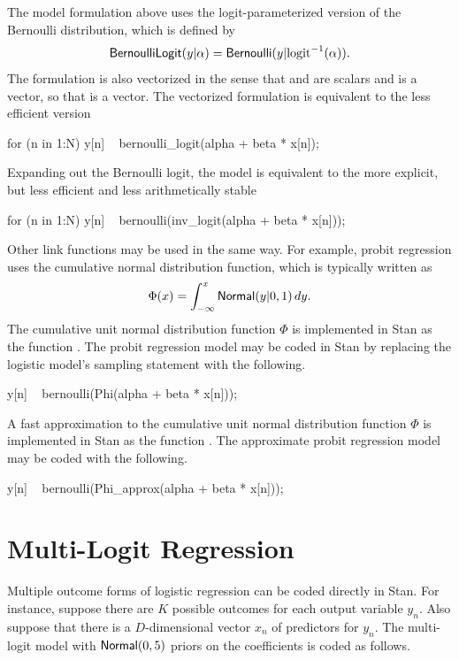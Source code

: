 The model formulation above uses the logit-parameterized version of
the Bernoulli distribution, which is defined by
%
\[
\mbox{\sf BernoulliLogit}(y|\alpha)
=
\mbox{\sf Bernoulli}(y | \mbox{logit}^{-1}(\alpha)).
\]
%
The formulation is also vectorized in the sense that  and
 are scalars and  is a vector, so that  is a vector.  The vectorized formulation is equivalent
to the less efficient version
%

\begin{stancode}
for (n in 1:N)
  y[n] ~ bernoulli_logit(alpha + beta * x[n]);
\end{stancode}
%
Expanding out the Bernoulli logit, the model is equivalent to the more
explicit, but less efficient and less arithmetically stable
%

\begin{stancode}
for (n in 1:N)
  y[n] ~ bernoulli(inv_logit(alpha + beta * x[n]));
\end{stancode}

Other link functions may be used in the same way.  For example, probit
regression uses the cumulative normal distribution function, which is
typically written as
\[
\Phi(x) = \int_{-\infty}^x \mbox{\sf Normal}(y|0,1) \, dy.
\]
%
The cumulative unit normal distribution function $\Phi$ is implemented
in Stan as the function .  The probit regression model
may be coded in Stan by replacing the logistic model's sampling
statement with the following.
%

\begin{stancode}
        y[n] ~ bernoulli(Phi(alpha + beta * x[n]));
\end{stancode}
%
A fast approximation to the cumulative unit normal distribution function
$\Phi$ is implemented in Stan as the function .  The
approximate probit regression model may be coded with the following.
%

\begin{stancode}
        y[n] ~ bernoulli(Phi_approx(alpha + beta * x[n]));
\end{stancode}

\section{Multi-Logit Regression}\label{multi-logit.section}

Multiple outcome forms of logistic regression can be coded directly in
Stan.  For instance, suppose there are $K$ possible outcomes for each
output variable $y_n$.  Also suppose that there is a $D$-dimensional
vector $x_n$ of predictors for $y_n$.  The multi-logit model with
$\mbox{\sf Normal}(0,5)$ priors on the coefficients is coded as follows.
%

